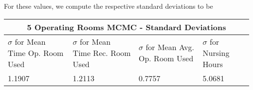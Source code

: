  For these values, we compute the respective standard deviations to be
 \vspace{0.1mm}
 
  \begin{tabular}{ |p{3cm}||p{3cm}|p{3cm}|p{3cm}|  }
  \hline
  \multicolumn{4}{|c|}{5 Operating Rooms MCMC - Standard Deviations} \\
  \hline
 $\sigma$ for Mean Time Op. Room Used&$\sigma$ for Mean Time Rec. Room Used&$\sigma$ for Mean Avg. Op. Room Used&$\sigma$ for Nursing Hours\\
 \hline
 1.1907&  1.2113& 0.7757 &5.0681\\
 \hline
\end{tabular}